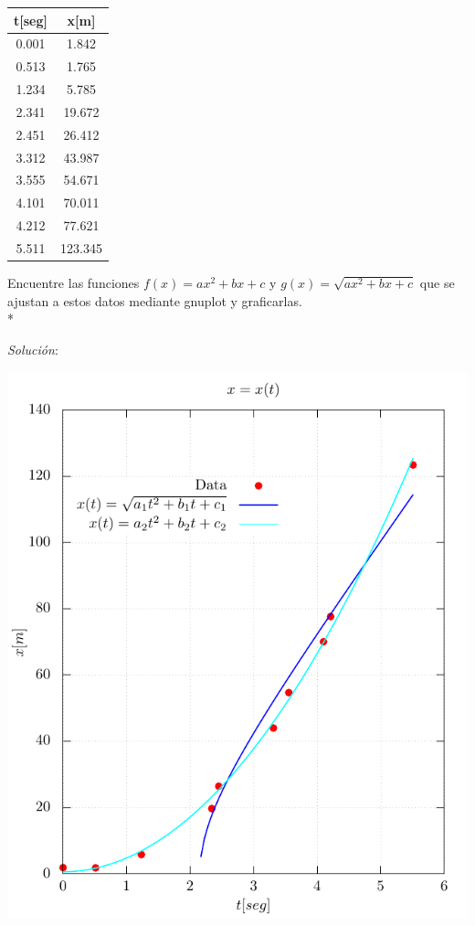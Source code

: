 \documentclass[11.5pt,a4paper]{article}
\begin{document}
\begin{center}
\begin{tabular}{|c|c|}
\hline 
{\bf t[seg]} & {\bf x[m]} \\ 
\hline
0.001 & 1.842 \\ 
\hline 
0.513 & 1.765 \\ 
\hline 
1.234 & 5.785 \\ 
\hline 
2.341 & 19.672 \\ 
\hline 
2.451 & 26.412 \\ 
\hline 
3.312 & 43.987\\
\hline
3.555 & 54.671\\
\hline
4.101 & 70.011\\
\hline
4.212 & 77.621\\
\hline
5.511 & 123.345\\
\hline
\end{tabular} 
\end{center}

Encuentre las funciones $f(x)=ax^2+bx+c$ y $g(x)=\sqrt{ax^2+bx+c}$ que se ajustan a estos datos mediante gnuplot y graficarlas.\\*

\textit{Solución}:

\includegraphics[scale=0.75]{ejercicio3.pdf}\\
\end{document}
